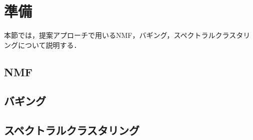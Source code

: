 \chapter{準備}
本節では，提案アプローチで用いるNMF，バギング，スペクトラルクラスタリングについて説明する．
\section{NMF}

\section{バギング}

\section{スペクトラルクラスタリング}
